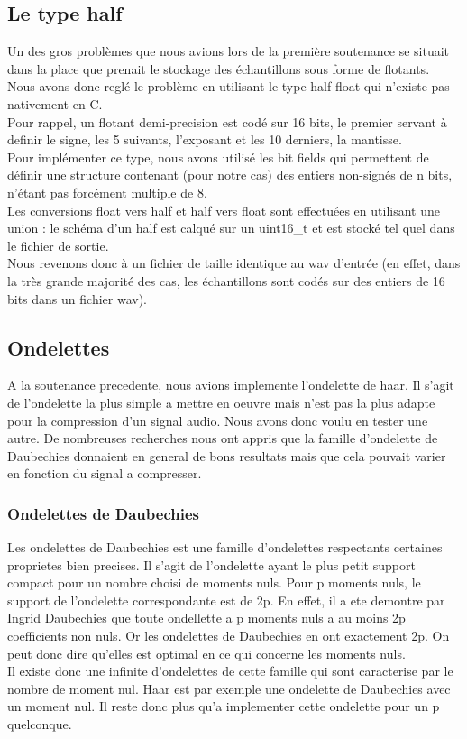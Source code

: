\documentclass[a4paper,12pt]{article}
\begin{document}
	\subsection{Le type half}
Un des gros problèmes que nous avions lors de la première soutenance se situait
dans la place que prenait le stockage des échantillons sous forme de flotants.\\
Nous avons donc reglé le problème en utilisant le type half float qui n'existe
pas nativement en C.\\
Pour rappel, un flotant demi-precision est codé sur 16 bits, le premier servant
à definir le signe, les 5 suivants, l'exposant et les 10 derniers, la
mantisse.\\
Pour implémenter ce type, nous avons utilisé les bit fields qui permettent de
définir une structure contenant (pour notre cas) des entiers non-signés de n
bits, n'étant pas forcément multiple de 8.\\
Les conversions float vers half et half vers float sont effectuées en utilisant
une union : le schéma d'un half est calqué sur un uint16\_t et est stocké tel
quel dans le fichier de sortie.\\
Nous revenons donc à un fichier de taille identique au wav d'entrée (en effet,
dans la très grande majorité des cas, les échantillons sont codés sur des
entiers de 16 bits dans un fichier wav).
	\subsection{Ondelettes}
A la soutenance precedente, nous avions implemente l'ondelette de
haar. Il s'agit de l'ondelette la plus simple a mettre en oeuvre mais
n'est pas la plus adapte pour la compression d'un signal audio.
Nous avons donc voulu en tester une autre. De nombreuses recherches
nous ont appris que la famille d'ondelette de Daubechies donnaient en
general de bons resultats mais que cela pouvait varier en fonction du
signal a compresser.\\
\subsubsection{Ondelettes de Daubechies}
Les ondelettes de Daubechies est une famille d'ondelettes respectants
certaines proprietes bien precises. Il s'agit de l'ondelette ayant le
plus petit support compact pour un nombre choisi de moments nuls. Pour
p moments nuls, le support de l'ondelette correspondante est de 2p. En
effet, il a ete demontre par Ingrid Daubechies que toute ondellette a
p moments nuls a au moins 2p coefficients non nuls. Or les ondelettes
de Daubechies en ont exactement 2p. On peut donc dire qu'elles est
optimal en ce qui concerne les moments nuls.\\
Il existe donc une infinite d'ondelettes de cette famille qui sont
caracterise par le nombre de moment nul. Haar est par exemple une
ondelette de Daubechies avec un moment nul. Il reste donc plus qu'a
implementer cette ondelette pour un p quelconque.
\end{document}
